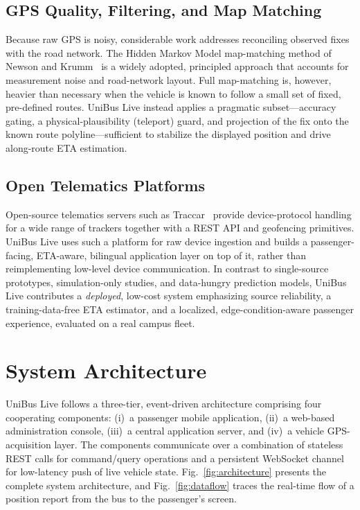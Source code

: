 \documentclass[conference]{IEEEtran}
\begin{document}
\subsection{GPS Quality, Filtering, and Map Matching}
Because raw GPS is noisy, considerable work addresses reconciling observed
fixes with the road network. The Hidden Markov Model map-matching method of
Newson and Krumm~\cite{newson2009} is a widely adopted, principled approach
that accounts for measurement noise and road-network layout. Full
map-matching is, however, heavier than necessary when the vehicle is known
to follow a small set of fixed, pre-defined routes. UniBus Live instead
applies a pragmatic subset---accuracy gating, a physical-plausibility
(teleport) guard, and projection of the fix onto the known route
polyline---sufficient to stabilize the displayed position and drive
along-route ETA estimation.

\subsection{Open Telematics Platforms}
Open-source telematics servers such as Traccar~\cite{traccar} provide
device-protocol handling for a wide range of trackers together with a REST
API and geofencing primitives. UniBus Live uses such a platform for raw
device ingestion and builds a passenger-facing, ETA-aware, bilingual
application layer on top of it, rather than reimplementing low-level device
communication. In contrast to single-source prototypes, simulation-only
studies, and data-hungry prediction models, UniBus Live contributes a
\emph{deployed}, low-cost system emphasizing source reliability, a
training-data-free ETA estimator, and a localized, edge-condition-aware
passenger experience, evaluated on a real campus fleet.

\section{System Architecture}
\label{sec:architecture}
UniBus Live follows a three-tier, event-driven architecture comprising four
cooperating components: (i)~a passenger mobile application, (ii)~a web-based
administration console, (iii)~a central application server, and (iv)~a
vehicle GPS-acquisition layer. The components communicate over a combination
of stateless REST calls for command/query operations and a persistent
WebSocket channel for low-latency push of live vehicle state.
Fig.~\ref{fig:architecture} presents the complete system
architecture, and Fig.~\ref{fig:dataflow} traces the real-time flow of
a position report from the bus to the passenger's screen.
\end{document}

